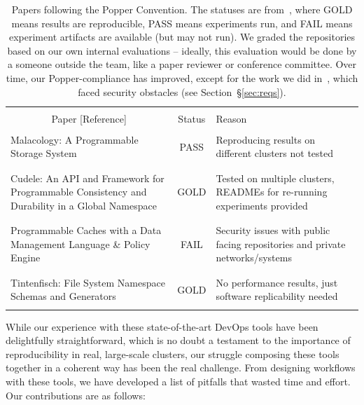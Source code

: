 \begin{table}[t]
\centering
\normalsize
\begin{tabular}{ >{}m{3.2in} | c | >{}m{2.9in} }
&\\
\multicolumn{1}{c|}{Paper [Reference]} & Status & Reason\\ \hline
&\\
Malacology: A Programmable Storage System~\cite{sevilla:eurosys17-malacology}
& PASS
& Reproducing results on different clusters not tested\\ 
&\\\hdashline
&\\
Cudele: An API and Framework for Programmable Consistency and Durability in a Global Namespace~\cite{sevilla:ipdps18-cudele}
& GOLD 
& Tested on multiple clusters, READMEs for re-running experiments provided\\
&\\\hdashline
&\\
Programmable Caches with a Data Management Language \& Policy Engine~\cite{sevilla:ccgrid18-parsplice}
& FAIL 
& Security issues with public facing repositories and private networks/systems\\
&\\\hdashline
&\\
Tintenfisch: File System Namespace Schemas and Generators~\cite{sevilla:techreport18-tintenfisch}
& GOLD 
& No performance results, just software replicability needed\\
&\\
\end{tabular}

\caption{Papers following the Popper Convention. The statuses are
from~\cite{jimenez:rr18-popper}, where GOLD means results are reproducible,
PASS means experiments run, and FAIL means experiment artifacts are available
(but may not run). We graded the repositories based on our own internal
evaluations -- ideally, this evaluation would be done by a someone outside the
team, like a paper reviewer or conference committee. Over time, our
Popper-compliance has improved, except for the work we did
in~\cite{sevilla:ccgrid18-parsplice}, which faced security obstacles (see
Section~\S\ref{sec:reqs}).}

\label{table:papers}
\end{table}

While our experience with these state-of-the-art
DevOps tools have been delightfully straightforward, which is no doubt a
testament to the importance of reproducibility in real, large-scale clusters,
our struggle composing these tools together in a coherent way has been the real
challenge.  From designing workflows with these tools, we have developed a list
of pitfalls that wasted time and effort. Our contributions are as follows:

